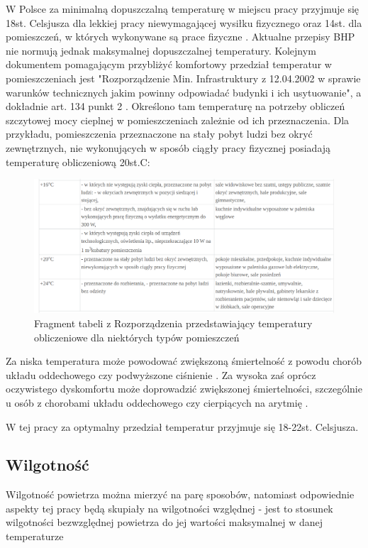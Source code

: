 \documentclass[a4paper, 12pt]{article}
\begin{document}
W Polsce za minimalną dopuszczalną temperaturę w miejscu pracy przyjmuje się 18st. Celsjusza dla 
lekkiej pracy niewymagającej wysiłku fizycznego oraz 14st. dla pomieszczeń, w których wykonywane są prace 
fizyczne \cite{manutan-bhp}. Aktualne przepisy BHP nie normują jednak maksymalnej dopuszczalnej temperatury. 
Kolejnym dokumentem pomagającym przybliżyć komfortowy przedział temperatur w pomieszczeniach jest
"Rozporządzenie Min. Infrastruktury z 12.04.2002 w sprawie warunków technicznych jakim powinny odpowiadać 
budynki i ich usytuowanie", a dokładnie art. 134 punkt 2 \cite{rozp-bud}. Określono tam temperaturę na potrzeby obliczeń szczytowej 
mocy cieplnej w pomieszczeniach zależnie od ich przeznaczenia.
Dla przykładu, pomieszczenia przeznaczone na stały pobyt ludzi bez okryć zewnętrznych, nie wykonujących 
w sposób ciągły pracy fizycznej posiadają temperaturę obliczeniową 20st.C:

\begin{figure}[H]
    \caption{Fragment tabeli z Rozporządzenia przedstawiający temperatury obliczeniowe dla niektórych typów pomieszczeń}
    \includegraphics[width=\textwidth]{zdj/min-tabela.png}
\end{figure}

Za niska temperatura może powodować zwiększoną śmiertelność z powodu chorób układu oddechowego czy podwyższone 
ciśnienie \cite{who-cold}. Za wysoka zaś oprócz oczywistego dyskomfortu może doprowadzić zwiększonej śmiertelności, 
szczególnie u osób z chorobami układu oddechowego czy cierpiących na arytmię \cite{bmj-heat}.

W tej pracy za optymalny przedział temperatur przyjmuje się 18-22st. Celsjusza.

\subsection{Wilgotność}

Wilgotność powietrza można mierzyć na parę sposobów, natomiast odpowiednie aspekty tej pracy będą 
skupiały na wilgotności względnej - jest to stosunek wilgotności bezwzględnej powietrza do jej wartości 
maksymalnej w danej temperaturze \cite{termodynamika}
\end{document}
